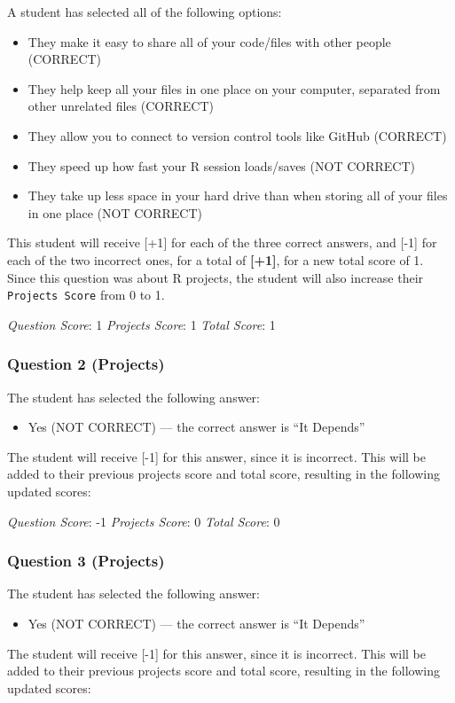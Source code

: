 \documentclass[12pt,twoside]{reedthesis}
\providecommand{\tightlist}{%
  \setlength{\itemsep}{0pt}\setlength{\parskip}{0pt}}
\begin{document}
A student has selected all of the following options:
\begin{itemize}
\tightlist
\item
  They make it easy to share all of your code/files with other people (CORRECT)
\item
  They help keep all your files in one place on your computer, separated from other unrelated files (CORRECT)
\item
  They allow you to connect to version control tools like GitHub (CORRECT)
\item
  They speed up how fast your R session loads/saves (NOT CORRECT)
\item
  They take up less space in your hard drive than when storing all of your files in one place (NOT CORRECT)
\end{itemize}
This student will receive {[}+1{]} for each of the three correct answers, and {[}-1{]} for each of the two incorrect ones, for a total of \textbf{{[}+1{]}}, for a new total score of 1. Since this question was about R projects, the student will also increase their \texttt{Projects\ Score} from 0 to 1.

\emph{Question Score}: 1 \emph{Projects Score}: 1 \emph{Total Score}: 1

\hypertarget{question-2-projects-1}{%
\subsubsection{Question 2 (Projects)}\label{question-2-projects-1}}

The student has selected the following answer:
\begin{itemize}
\tightlist
\item
  Yes (NOT CORRECT) --- the correct answer is ``It Depends''
\end{itemize}
The student will receive {[}-1{]} for this answer, since it is incorrect. This will be added to their previous projects score and total score, resulting in the following updated scores:

\emph{Question Score}: -1 \emph{Projects Score}: 0 \emph{Total Score}: 0

\hypertarget{question-3-projects-1}{%
\subsubsection{Question 3 (Projects)}\label{question-3-projects-1}}

The student has selected the following answer:
\begin{itemize}
\tightlist
\item
  Yes (NOT CORRECT) --- the correct answer is ``It Depends''
\end{itemize}
The student will receive {[}-1{]} for this answer, since it is incorrect. This will be added to their previous projects score and total score, resulting in the following updated scores:
\end{document}
